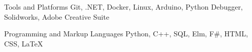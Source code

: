 

\begin{cvskills}

  \cvskill
    {Tools and Platforms} %
    {Git, .NET, Docker, Linux, Arduino, Python Debugger, Solidworks, Adobe Creative Suite} %

  \cvskill
    {Programming and Markup Languages} %
    {Python, C++, SQL, Elm, F\#, HTML, CSS, LaTeX} %
\end{cvskills}
